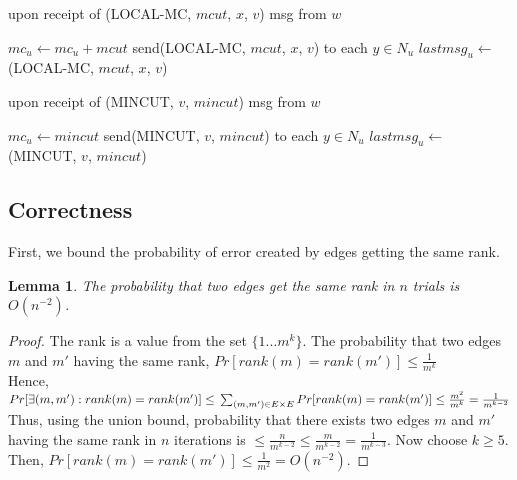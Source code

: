 \documentclass{acm_proc_article-sp}
\begin{document}
\begin{algorithm}                      \caption{upon receipt of (LOCAL-MC, $mcut$, $x$, $v$) msg from $w$}   \label{alg21}                           \begin{algorithmic}
\STATE{}
\STATE $mc_{u}\leftarrow mc_{u} + mcut$
\ELSE
\STATE send(LOCAL-MC, $mcut$, $x$, $v$) to each $y\in N_{u}$
\ENDIF
\STATE $lastmsg_{u}\leftarrow$ (LOCAL-MC, $mcut$, $x$, $v$)
\ENDIF
\end{algorithmic}
\end{algorithm}

\begin{algorithm}                      \caption{upon receipt of (MINCUT, $v$, $mincut$) msg from $w$}   \label{alg22}                           \begin{algorithmic}
\STATE{}
\STATE $mc_{u}\leftarrow mincut$
\STATE send(MINCUT, $v$, $mincut$) to each $y\in N_{u}$
\STATE $lastmsg_{u}\leftarrow$ (MINCUT, $v$, $mincut$)
\ENDIF
\end{algorithmic}
\end{algorithm}


\subsection{Correctness}
First, we bound the probability of error created by edges getting the same rank.

\newtheorem{mydef12}{Lemma}[subsection]
\begin{mydef12}
 The probability that two edges get the same rank in $n$ trials is $O(n^{-2})$.
\end{mydef12}

\begin{proof}
The rank is a value from the set $\{1...m^{k}\}$. The probability that two edges $m$ and $m'$ having the same rank,
$Pr[rank(m)=rank(m')] \leq \frac{1}{m^{k}}$
\\Hence, $Pr[\exists (m,m'): rank(m)=rank(m')] \leq \\ \sum_{(m,m')\in E\times E}{Pr[rank(m)=rank(m')]} \leq \frac{m^{2}}{m^{k}} = \frac{1}{m^{k-2}}$
\newline
Thus, using the union bound, probability that there exists two edges $m$ and $m'$ having the same rank in $n$ iterations is
$\leq \frac{n}{m^{k-2}} \leq \frac{m}{m^{k-2}} = \frac{1}{m^{k-3}}$.
Now choose $k \geq 5$. Then, $Pr[rank(m)=rank(m')] \leq \frac{1}{m^{2}} = O(n^{-2})$.
\end{proof}
\end{document}

